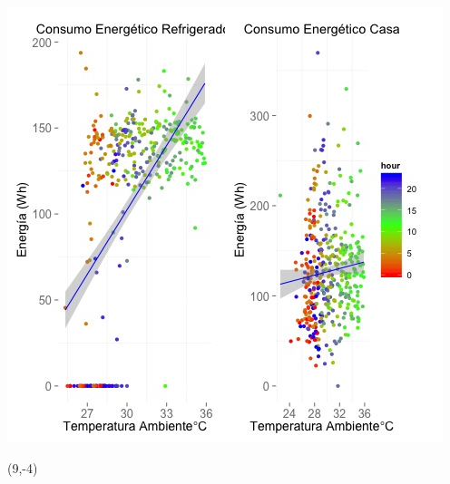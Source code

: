 \documentclass{article}\usepackage[]{graphicx}\usepackage[]{color}
\newenvironment{knitrout}{}{} %
\begin{document}
\begin{knitrout}
\color{fgcolor}
\includegraphics[scale=0.75]{figure/A25_correlaciones} 
\end{knitrout}

 \begin{textblock}{1}(9,-4)
\begin{minipage}{20em}
\begingroup

\endgroup
\end{minipage}
\end{textblock}
\end{document}
